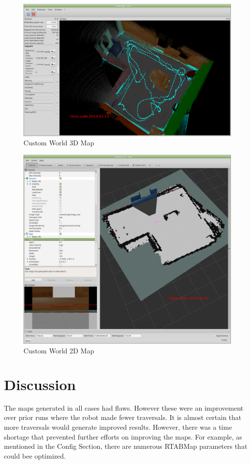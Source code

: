 \documentclass[10pt,journal,compsoc]{IEEEtran}
\begin{document}
\begin{figure}[h]
      \centering
      \includegraphics[width=\linewidth]{Assets/RTabViewMap_Custom.png}
      \caption{Custom World 3D Map}
      \label{fig:customworld_Map_3D}
\end{figure}

\begin{figure}[h]
      \centering
      \includegraphics[width=\linewidth]{Assets/rviz_custom_map.png}
      \caption{Custom World 2D Map}
      \label{fig:customworld_Map_2D}
\end{figure}



\section{Discussion}
The maps generated in all cases had flaws. However these were an improvement over prior runs where the robot made fewer traversals. It is almost certain that more traversals would generate improved results. However, there was a time shortage that prevented further efforts on improving the maps. For example, as mentioned in the Config Section, there are numerous RTABMap parameters that could bee optimized.
\end{document}
